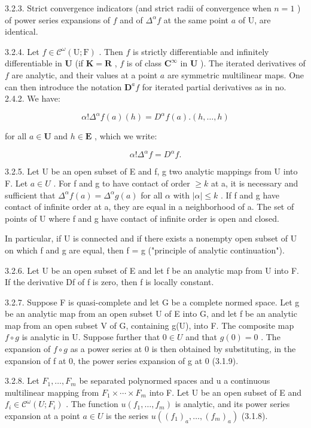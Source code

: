 3.2.3. Strict convergence indicators (and strict radii of convergence when \(n=1\) ) of power series expansions of \(f\) and of \(\Delta^{\alpha}f\) at the same point \(a\) of U, are identical.

3.2.4. Let \(f \in \mathcal{C}^{\omega}(\mathrm{U};\mathrm{F})\) . Then \(f\) is strictly differentiable and infinitely differentiable in \(\mathbf{U}\) (if \(\mathbf{K} = \mathbf{R}\) , \(f\) is of class \(\mathbf{C}^{\infty}\) in \(\mathbf{U} \) ). The iterated derivatives of \(f\) are analytic, and their values at a point \(a\) are symmetric multilinear maps. One can then introduce the notation \(\mathbf{D}^{a}f\) for iterated partial derivatives as in no. 2.4.2. We have:

\[
\alpha ! \Delta^ {\alpha} f (a) (h) = D ^ {\alpha} f (a). (h, \dots , h)
\]

for all \(a \in \mathbf{U}\) and \(h \in \mathbf{E}\) , which we write:

\[
\alpha ! \Delta^ {\alpha} f = D ^ {\alpha} f.
\]

3.2.5. Let U be an open subset of E and f, g two analytic mappings from U into F. Let \(a \in U\) . For f and g to have contact of order \(\geqslant k\) at a, it is necessary and sufficient that \(\Delta^{\alpha}f(a) = \Delta^{\alpha}g(a)\) for all \(\alpha\) with \(|\alpha| \leqslant k\) . If f and g have contact of infinite order at a, they are equal in a neighborhood of a. The set of points of U where f and g have contact of infinite order is open and closed.

In particular, if U is connected and if there exists a nonempty open subset of U on which f and g are equal, then f = g ("principle of analytic continuation").

3.2.6. Let U be an open subset of E and let f be an analytic map from U into F. If the derivative Df of f is zero, then f is locally constant.

3.2.7. Suppose F is quasi-complete and let G be a complete normed space. Let g be an analytic map from an open subset U of E into G, and let f be an analytic map from an open subset V of G, containing g(U), into F. The composite map \(f \circ g\) is analytic in U. Suppose further that \(0 \in U\) and that \(g(0) = 0\) . The expansion of \(f \circ g\) as a power series at 0 is then obtained by substituting, in the expansion of f at 0, the power series expansion of g at 0 (3.1.9).

3.2.8. Let \(F_{1},\ldots,F_{m}\) be separated polynormed spaces and u a continuous multilinear mapping from \(F_{1}\times\cdots\times F_{m}\) into F. Let U be an open subset of E and \(f_{i}\in\mathcal{C}^{\omega}(U;F_{i})\) . The function \(u(f_{1},\ldots,f_{m})\) is analytic, and its power series expansion at a point \(a\in U\) is the series \(u((f_{1})_{a},\ldots,(f_{m})_{a})\) (3.1.8).

